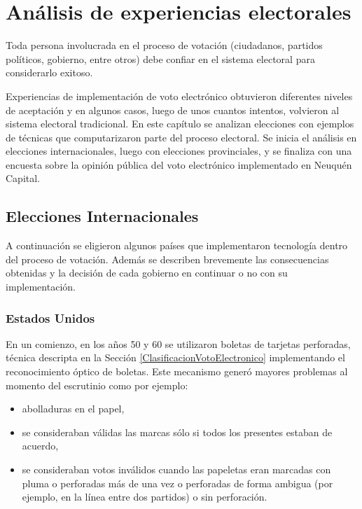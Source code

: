 \chapter{Análisis de experiencias electorales}
\label{Elecciones}

Toda persona involucrada en el proceso de votación (ciudadanos, partidos políticos, gobierno, entre otros) debe confiar en el sistema electoral para considerarlo exitoso.

Experiencias de implementación de voto electrónico obtuvieron diferentes niveles de aceptación y en algunos casos, luego de unos cuantos intentos, volvieron al sistema electoral tradicional.
En este capítulo se analizan elecciones con ejemplos de técnicas que computarizaron parte del proceso electoral. Se inicia el análisis en elecciones internacionales, luego con elecciones provinciales, y se finaliza con una encuesta sobre la opinión pública del voto electrónico implementado en Neuquén Capital.

\section{Elecciones Internacionales}
A continuación se eligieron algunos países que implementaron tecnología dentro del proceso de votación. Además se describen brevemente las consecuencias obtenidas y la decisión de cada gobierno en continuar o no con su implementación.

\subsection{Estados Unidos}

En un comienzo, en los años 50 y 60 se utilizaron boletas de tarjetas perforadas, técnica descripta en la Sección \ref{ClasificacionVotoElectronico} implementando el reconocimiento óptico de boletas. Este mecanismo generó mayores problemas al momento del escrutinio como por ejemplo:
\begin{itemize}
    \item abolladuras en el papel,
    \item se consideraban válidas las marcas sólo si todos los presentes estaban de acuerdo,
    \item se consideraban votos inválidos cuando las papeletas eran marcadas con pluma o perforadas más de una vez o perforadas de forma ambigua (por ejemplo, en la línea entre dos partidos) o sin perforación.
\end{itemize}

